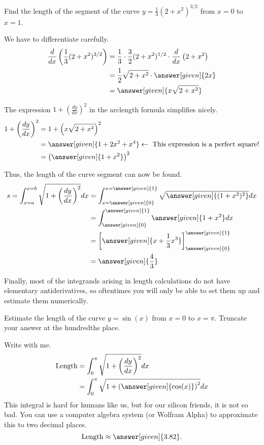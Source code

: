 \documentclass{ximera}
\begin{document}
\begin{example}
Find the length of the segment of the curve $y=\frac{1}{3}(2+x^2)^{3/2}$ from $x=0$ to $x=1$.  

\begin{explanation}
We have to differentiate carefully.
\begin{align*}
\frac{d}{dx}\left(\frac{1}{3}(2+x^2)^{3/2}\right) &= \frac{1}{3} \cdot \frac{3}{2}(2+x^2)^{1/2} \cdot \frac{d}{dx} \left(2+x^2\right) \\
&= \frac{1}{2} \sqrt{2+x^2} \cdot \answer[given]{2x} \\
&= \answer[given]{x\sqrt{2+x^2}}
\end{align*}

The expression $1+\left(\frac{dy}{dx}\right)^2$ in the arclength formula simplifies nicely.
\begin{align*}
1+\left(\frac{dy}{dx}\right)^2 &= 1+\left(x\sqrt{2+x^2}\right)^2 \\
&=  \answer[given]{1+2x^2+x^4} \leftarrow \textrm{ This expression is a perfect square!} \\
&= \left(\answer[given]{1+x^2}\right)^2
\end{align*}

Thus, the length of the curve segment can now be found.
\begin{align*}
s  = \int_{x=a}^{x=b} \sqrt{1+ \left(\frac{dy}{dx}\right)^2} dx &=  \int_{x=\answer[given]{0}}^{x=\answer[given]{1}} \sqrt{\answer[given]{(1+x^2)^2} } dx \\
&= \int_{\answer[given]{0}}^{\answer[given]{1}} \answer[given]{1+x^2} dx \\
&= \bigg[\answer[given]{x+\frac{1}{3} x^3}\bigg]_{\answer[given]{0}}^{\answer[given]{1}}\\
&= \answer[given]{\frac{4}{3}}
\end{align*}
\end{explanation}
\end{example}

Finally, most of the integrands arising in length calculations do not have elementary antiderivatives, so oftentimes you will only be able to set them up and estimate them numerically.

\begin{example}
  Estimate the length of the curve $y = \sin(x)$ from $x=0$ to $x =  \pi$.  Truncate your answer at the hundredths place.
  \begin{explanation}
    Write with me.
    \begin{align*}
      \text{Length} &= \int_0^\pi \sqrt{1+\left( \frac{dy}{ dx}\right)^2} dx\\
      &= \int_0^\pi \sqrt{1+\left(
        \answer[given]{\cos(x)}\right)^2} dx
    \end{align*}
    This integral is hard for humans like us, but for our silicon
    friends, it is not so bad.  You can use a computer algebra system
    (or Wolfram Alpha) to approximate this to two decimal places.
    \[
    \text{Length} \approx \answer[given]{3.82}.
    \]
  \end{explanation}
\end{example}
\end{document}
